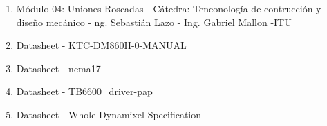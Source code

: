 \begin{enumerate}
    \item Módulo 04: Uniones Roscadas - Cátedra: Tenconología de contrucción y diseño mecánico - ng. Sebastián Lazo - Ing. Gabriel Mallon -ITU
    \item Datasheet - KTC-DM860H-0-MANUAL
    \item Datasheet - nema17
    \item Datasheet - TB6600\_driver-pap
    \item Datasheet - Whole-Dynamixel-Specification
\end{enumerate}
